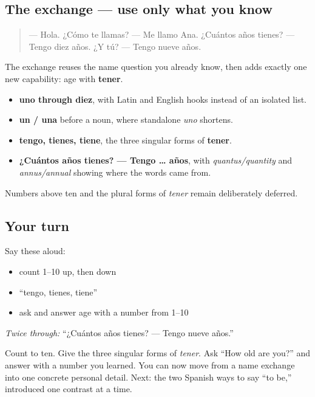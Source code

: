 \subsection*{The exchange — use only what you know}
\begin{quote}
— Hola. ¿Cómo te llamas? — Me llamo Ana. ¿Cuántos años tienes? — Tengo diez años. ¿Y tú? — Tengo nueve años.
\end{quote}

The exchange reuses the name question you already know, then adds exactly one new capability: age with \textbf{tener}.

\begin{grammarlens}[title={What you've built this chapter}]
\begin{itemize}
\raggedright
  \item \textbf{uno through diez}, with Latin and English hooks instead of an isolated list.
  \item \textbf{un / una} before a noun, where standalone \emph{uno} shortens.
  \item \textbf{tengo, tienes, tiene}, the three singular forms of \textbf{tener}.
  \item \textbf{¿Cuántos años tienes? — Tengo … años}, with \emph{quantus/quantity} and \emph{annus/annual} showing where the words came from.
\end{itemize}

Numbers above ten and the plural forms of \emph{tener} remain deliberately deferred.
\end{grammarlens}

\subsection*{Your turn}
Say these aloud:

\begin{itemize}
\raggedright
  \item count 1–10 up, then down
  \item “tengo, tienes, tiene”
  \item ask and answer age with a number from 1–10
\end{itemize}

\emph{Twice through:} “¿Cuántos años tienes? — Tengo nueve años.”

\begin{tcolorbox}[breakable,colback=teal!4,colframe=teal!35!black,title={Before you move on}]
Count to ten. Give the three singular forms of \emph{tener}. Ask “How old are you?” and answer with a number you learned. You can now move from a name exchange into one concrete personal detail. Next: the two Spanish ways to say “to be,” introduced one contrast at a time.
\end{tcolorbox}

